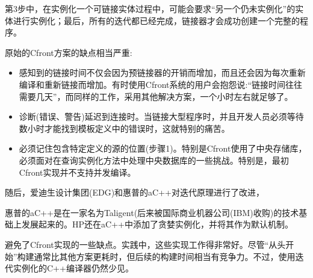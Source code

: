 第3步中，在实例化一个可链接实体过程中，可能会要求“另一个仍未实例化”的实体进行实例化；最后，所有的迭代都已经完成，链接器才会成功创建一个完整的程序。

原始的Cfront方案的缺点相当严重:

\begin{itemize}
\item 
感知到的链接时间不仅会因为预链接器的开销而增加，而且还会因为每次重新编译和重新链接而增加。有时使用Cfront系统的用户会抱怨说:“链接时间往往需要几天”，而同样的工作，采用其他解决方案，一个小时左右就足够了。

\item 
诊断(错误、警告)延迟到连接时。当链接大型程序时，并且开发人员必须等待数小时才能找到模板定义中的错误时，这就特别的痛苦。

\item 
必须记住包含特定定义的源的位置(步骤1)。特别是Cfront使用了中央存储库，必须面对在查询实例化方法中处理中央数据库的一些挑战。特别是，最初Cfront实现并不支持并发编译。
\end{itemize}

随后，爱迪生设计集团(EDG)和惠普的aC++对迭代原理进行了改进，

\begin{notice}
惠普的aC++是在一家名为Taligent(后来被国际商业机器公司(IBM)收购)的技术基础上发展起来的。HP还在aC++中添加了贪婪实例化，并将其作为默认机制。
\end{notice}

避免了Cfront实现的一些缺点。实践中，这些实现工作得非常好。尽管“从头开始”构建通常比其他方案更耗时，但后续的构建时间相当有竞争力。不过，使用迭代实例化的C++编译器仍然少见。
















